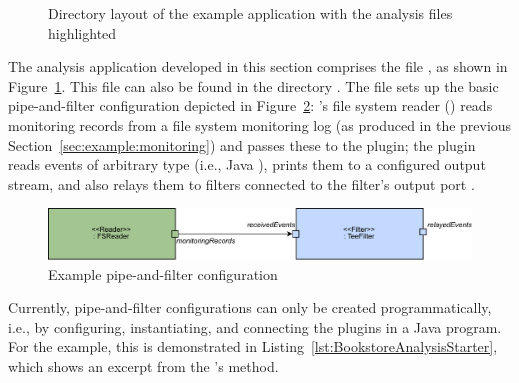 \begin{figure}[H]
\begin{graybox}
\end{graybox}
\caption{Directory layout of the example application with the analysis files highlighted}
\label{lst:analysisExampleLayout}
\end{figure}

\noindent The analysis application developed in this section comprises the file %
, as shown in Figure~\ref{lst:analysisExampleLayout}. %
This file can also be found in the directory \dir{\manualInstrumentedBookstoreApplicationDirDistro{}/}.
The file sets up the basic pipe-and-filter configuration depicted in Figure~\ref{fig:example:ch2:pipe-and-filter}: %
\Kieker{}'s file system reader () reads monitoring records %
from a file system monitoring log (as produced in the previous Section~\ref{sec:example:monitoring}) %
and passes these to the  plugin; the  plugin %
reads events of arbitrary type (i.e., Java ), prints them to a %
configured output stream, and also relays them to filters connected to the %
filter's output port . %

\begin{figure}[h]
\includegraphics[width=\textwidth]{images/ch2-example-pnp}
\caption{Example pipe-and-filter configuration}
\label{fig:example:ch2:pipe-and-filter}
\end{figure}

Currently, \KiekerAnalysisPart{} pipe-and-filter configurations can only %
be created programmatically, i.e., by configuring, instantiating, and %
connecting the plugins in a Java program. %
For the example, this is demonstrated in Listing~\ref{lst:BookstoreAnalysisStarter}, %
which shows an excerpt from the 's  %
method. %

